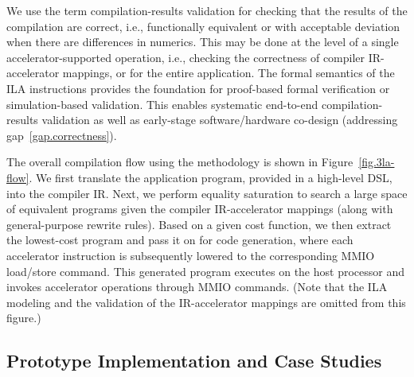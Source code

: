 
We use the term compilation-results validation for checking that the results of the compilation are correct, i.e., functionally equivalent or with acceptable deviation when there are differences in numerics.
This may be done at the level of a single accelerator-supported operation, i.e., checking the correctness of compiler IR-accelerator mappings, or for the entire application.
%
%
The formal semantics of the ILA instructions provides the foundation for 
%
%
proof-based formal verification or simulation-based validation. %
%
This enables systematic end-to-end compilation-results validation as well as early-stage software/hardware co-design (addressing gap~\ref{gap.correctness}).




The overall compilation flow using the {\TLA} methodology is shown in Figure~\ref{fig.3la-flow}.
%
We first translate the application program, provided in a high-level DSL, into the compiler IR. 
%
Next, we perform equality saturation
to search a large space of equivalent programs given the compiler IR-accelerator mappings
(along with general-purpose rewrite rules).
%
Based on a given cost function, we then extract the
lowest-cost
program and pass it on for code generation, where each accelerator instruction is subsequently lowered to the corresponding MMIO load/store command. %
%
This generated program executes on the host processor and invokes accelerator operations through MMIO commands.
%
(Note that the ILA modeling and the validation of the IR-accelerator mappings are omitted from this figure.)

\subsection{Prototype Implementation and Case Studies}

